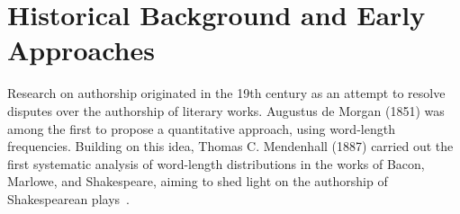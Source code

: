 \section{Historical Background and Early Approaches}

Research on authorship originated in the 19th century as an attempt to resolve disputes over the authorship of literary works. 
Augustus de Morgan (1851) was among the first to propose a quantitative approach, using word-length frequencies. 
Building on this idea, Thomas C. Mendenhall (1887) carried out the first systematic analysis of word-length distributions in the works of Bacon, Marlowe, and Shakespeare, aiming to shed light on the authorship of Shakespearean plays~\citep{neal_surveying_2018,stamatatos_survey_2009}.

